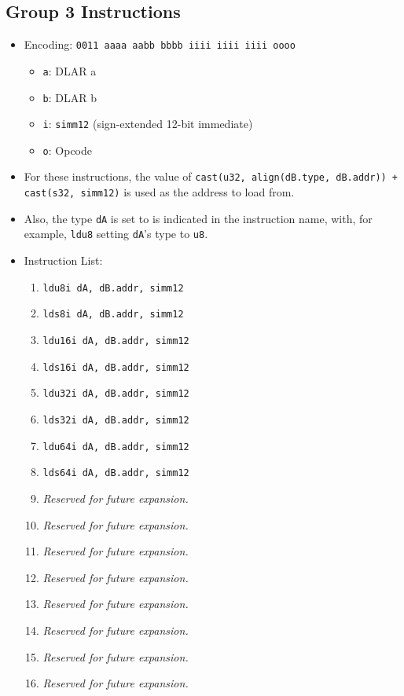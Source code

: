 \documentclass{article}
\begin{document}
	\subsection{Group 3 Instructions}
		\begin{itemize}
		\item Encoding: \texttt{0011 aaaa aabb bbbb  iiii iiii iiii oooo}
			\begin{itemize}
			\item \texttt{a}: DLAR a
			\item \texttt{b}: DLAR b
			\item \texttt{i}: \texttt{simm12} (sign-extended 12-bit
				immediate)
			\item \texttt{o}: Opcode
			\end{itemize}
		\item For these instructions, the value of
			\texttt{cast(u32, align(dB.type, dB.addr)) + cast(s32, simm12)}
			is used as the address to load from.
		\item Also, the type \texttt{dA} is set to is indicated in the
			instruction name, with, for example, \texttt{ldu8} setting
			\texttt{dA}'s type to \texttt{u8}.
		\item Instruction List:
			\begin{enumerate}
			\item \texttt{ldu8i dA, dB.addr, simm12}
			\item \texttt{lds8i dA, dB.addr, simm12}
			\item \texttt{ldu16i dA, dB.addr, simm12}
			\item \texttt{lds16i dA, dB.addr, simm12}

			\item \texttt{ldu32i dA, dB.addr, simm12}
			\item \texttt{lds32i dA, dB.addr, simm12}
			\item \texttt{ldu64i dA, dB.addr, simm12}
			\item \texttt{lds64i dA, dB.addr, simm12}

			\item \textit{Reserved for future expansion.}
			\item \textit{Reserved for future expansion.}
			\item \textit{Reserved for future expansion.}
			\item \textit{Reserved for future expansion.}

			\item \textit{Reserved for future expansion.}
			\item \textit{Reserved for future expansion.}
			\item \textit{Reserved for future expansion.}
			\item \textit{Reserved for future expansion.}
			\end{enumerate}
		\end{itemize}
		\newpage
\end{document}
